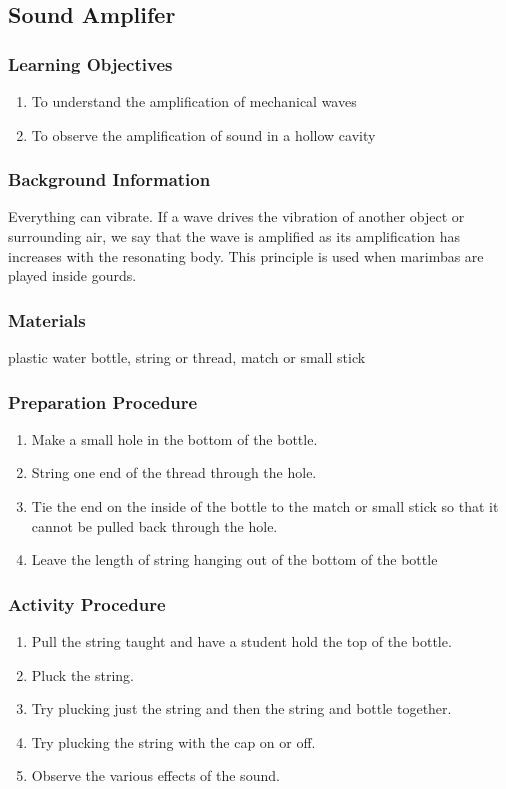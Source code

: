 \subsection{Sound Amplifer}

\subsubsection*{Learning Objectives}
\begin{enumerate}
\item{To understand the amplification of mechanical waves}
\item{To observe the amplification of sound in a hollow cavity}
\end{enumerate}

\subsubsection*{Background Information}
Everything can vibrate.  If a wave drives the vibration of another object or surrounding air, we say that the wave is amplified as its amplification has increases with the resonating body.  This principle is used when marimbas are played inside gourds.

\subsubsection*{Materials}
plastic water bottle, string or thread, match or small stick

\subsubsection*{Preparation Procedure}
\begin{enumerate}
\item{Make a small hole in the bottom of the bottle.}
\item{String one end of the thread through the hole.}
\item{Tie the end on the inside of the bottle to the match or small stick so that it cannot be pulled back through the hole.}
\item{Leave the length of string hanging out of the bottom of the bottle}
\end{enumerate}

\subsubsection*{Activity Procedure}
\begin{enumerate}
\item{Pull the string taught and have a student hold the top of the bottle.}
\item{Pluck the string.}
\item{Try plucking just the string and then the string and bottle together.}
\item{Try plucking the string with the cap on or off.}
\item{Observe the various effects of the sound.}
\end{enumerate}

